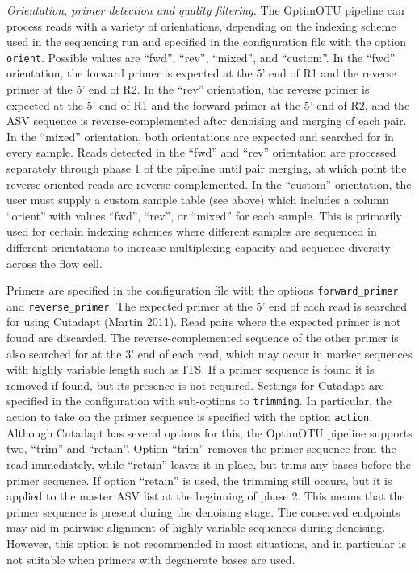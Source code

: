 \documentclass[
]{article}
\begin{document}
\emph{Orientation, primer detection and quality filtering.}
The OptimOTU pipeline can process reads with a variety of orientations, depending on the indexing scheme used in the sequencing run and specified in the configuration file with the option \texttt{orient}.
Possible values are ``fwd'', ``rev'', ``mixed'', and ``custom''.
In the ``fwd'' orientation, the forward primer is expected at the 5' end of R1 and the reverse primer at the 5' end of R2.
In the ``rev'' orientation, the reverse primer is expected at the 5' end of R1 and the forward primer at the 5' end of R2, and the ASV sequence is reverse-complemented after denoising and merging of each pair.
In the ``mixed'' orientation, both orientations are expected and searched for in every sample.
Reads detected in the ``fwd'' and ``rev'' orientation are processed separately through phase 1 of the pipeline until pair merging, at which point the reverse-oriented reads are reverse-complemented.
In the ``custom'' orientation, the user must supply a custom sample table (see above) which includes a column ``orient'' with values ``fwd'', ``rev'', or ``mixed'' for each sample.
This is primarily used for certain indexing schemes where different samples are sequenced in different orientations to increase multiplexing capacity and sequence diversity across the flow cell.

Primers are specified in the configuration file with the options \texttt{forward\_primer} and \texttt{reverse\_primer}.
The expected primer at the 5' end of each read is searched for using Cutadapt (Martin 2011).
Read pairs where the expected primer is not found are discarded.
The reverse-complemented sequence of the other primer is also searched for at the 3' end of each read, which may occur in marker sequences with highly variable length such as ITS.
If a primer sequence is found it is removed if found, but its presence is not required.
Settings for Cutadapt are specified in the configuration with sub-options to \texttt{trimming}.
In particular, the action to take on the primer sequence is specified with the option \texttt{action}.
Although Cutadapt has several options for this, the OptimOTU pipeline supports two, ``trim'' and ``retain''.
Option ``trim'' removes the primer sequence from the read immediately, while ``retain'' leaves it in place, but trims any bases before the primer sequence.
If option ``retain'' is used, the trimming still occurs, but it is applied to the master ASV list at the beginning of phase 2.
This means that the primer sequence is present during the denoising stage.
The conserved endpoints may aid in pairwise alignment of highly variable sequences during denoising.
However, this option is not recommended in most situations, and in particular is not suitable when primers with degenerate bases are used.
\end{document}
